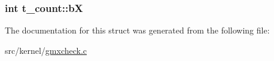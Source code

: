 \hypertarget{structt__count_a1e063a027a0c3d8240db29c8a25af449}{
\subsubsection[{b\-X}]{\setlength{\rightskip}{0pt plus 5cm}int {\bf t\-\_\-count\-::b\-X}}}\label{structt__count_a1e063a027a0c3d8240db29c8a25af449}


\-The documentation for this struct was generated from the following file\-:\begin{DoxyCompactItemize}
\item 
src/kernel/\hyperlink{gmxcheck_8c}{gmxcheck.\-c}\end{DoxyCompactItemize}
